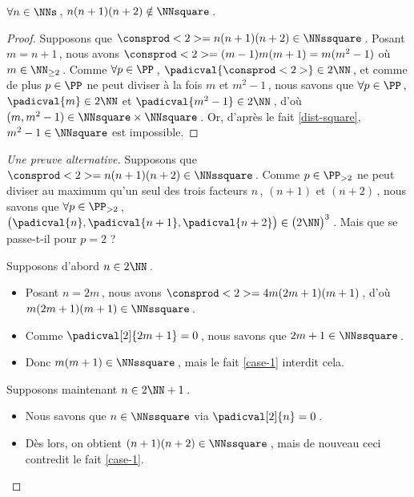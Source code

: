 \begin{fact} \label{case-2}
	 $\forall n \in \NNs$\,, $n(n+1)(n+2) \notin \NNsquare$\,.
\end{fact}




\begin{proof}
    Supposons que $\consprod<2> = n(n+1)(n+2) \in \NNssquare$\,.
    Posant $m = n+1$\,, nous avons $\consprod<2> = (m-1)m(m+1) = m(m^2 - 1)$ où $m \in \NN_{\geq 2}$\,.
    Comme $\forall p \in \PP$\,, $\padicval{\consprod<2>} \in 2 \NN$\,, et comme de plus $p \in \PP$ ne peut diviser à la fois $m$ et $m^2 - 1$\,, nous savons que 
    $\forall p \in \PP$\,, 
    $\padicval{m} \in 2 \NN$ et $\padicval{m^2 - 1} \in 2 \NN$\,,
    d'où 
    $(m, m^2 - 1) \in \NNsquare \times \NNsquare$\,.
    Or, d'après le fait \ref{dist-square}, $m^2 - 1 \in \NNsquare$ est impossible.
\end{proof}




\begin{proof}[Une preuve alternative]
    Supposons que $\consprod<2> = n(n+1)(n+2) \in \NNssquare$\,.
    Comme $p \in \PP_{>2}$ ne peut diviser au maximum qu'un seul des trois facteurs $n$\,, $(n+1)$ et $(n+2)$\,, nous savons que 
    $\forall p \in \PP_{>2}$\,, 
    $\big( \padicval{n} , \padicval{n + 1} , \padicval{n + 2} \big) \in \big( 2 \NN \big)^3$\,.
    Mais que se passe-t-il pour $p = 2$ ?
    
    \medskip
    
    Supposons d'abord $n \in 2 \NN$\,.
	\begin{itemize}
		\item Posant $n = 2 m$\,, nous avons $\consprod<2> = 4 m(2m+1)(m+1)$\,, d'où $m(2m+1)(m+1) \in \NNssquare$\,.
		
		\item Comme $\padicval[2]{2m+1} = 0$\,, nous savons que $2m+1 \in \NNssquare$\,.
		
		\item Donc $m(m+1)\in \NNssquare$\,, mais le fait \ref{case-1} interdit cela.
	\end{itemize}
    
    \medskip
    
    Supposons maintenant $n \in 2 \NN + 1$\,.
	\begin{itemize}
		\item Nous savons que $n \in \NNssquare$ via $\padicval[2]{n} = 0$\,.

		\item Dès lors, on obtient $(n+1)(n+2) \in \NNssquare$\,, mais de nouveau ceci contredit le fait \ref{case-1}. \qedhere
	\end{itemize}
\end{proof}